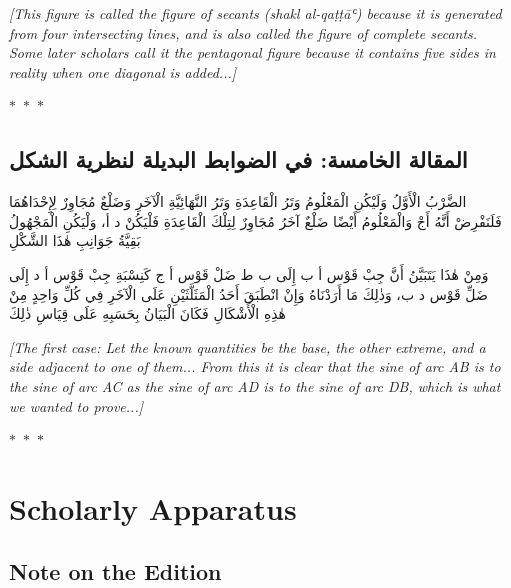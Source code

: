 \documentclass[11pt,a4paper]{article}
\theoremstyle{plain}
\theoremstyle{definition}
\theoremstyle{remark}
\newcommand{\ar}[1]{{\arabicfont\beginR #1\endR}}
\newcommand{\ornament}{\begin{center}\textcolor{goldaccent}{$\ast$~$\ast$~$\ast$}\end{center}}
\begin{document}
\vspace{0.3cm}
\noindent\noindent\textcolor{notecolor}{\textit{[This figure is called the figure of secants (shakl al-qaṭṭāʿ) because it is generated from four intersecting lines, and is also called the figure of complete secants. Some later scholars call it the pentagonal figure because it contains five sides in reality when one diagonal is added...]}}

\ornament

\subsection*{\ar{المقالة الخامسة: في الضوابط البديلة لنظرية الشكل}}

\ar{الضَّرْبُ الْأَوَّلُ وَلَيْكُنِ الْمَعْلُومُ وَتَرُ الْقَاعِدَةِ وَتَرُ النَّهَائِيَّةِ الْآخَرِ وَضَلْعٌ مُجَاوِرٌ لِإِحْدَاهُمَا فَلَنَفْرِضْ أَنَّهُ أَجْ وَالْمَعْلُومُ أَيْضًا ضَلْعٌ آخَرُ مُجَاوِرٌ لِتِلْكَ الْقَاعِدَةِ فَلْيَكُنْ د أ، وَلْيَكُنِ الْمَجْهُولُ بَقِيَّةُ جَوَانِبِ هٰذَا الشَّكْلِ

وَمِنْ هٰذَا يَتَبَيَّنُ أَنَّ جِبْ قَوْس أ ب إِلَى ب ط ضَلْ قَوْس أ ج كَنِسْبَةِ جِبْ قَوْس أ د إِلَى ضَلِّ قَوْس د ب، وَذٰلِكَ مَا أَرَدْنَاهُ وَإِنْ انْطَبَقَ أَحَدُ الْمَثَلَّثَيْنِ عَلَى الْآخَرِ فِي كُلِّ وَاحِدٍ مِنْ هٰذِهِ الْأَشْكَالِ فَكَانَ الْبَيَانُ بِحَسَبِهِ عَلَى قِيَاسِ ذٰلِكَ}

\vspace{0.3cm}
\noindent\textcolor{notecolor}{\textit{[The first case: Let the known quantities be the base, the other extreme, and a side adjacent to one of them... From this it is clear that the sine of arc AB is to the sine of arc AC as the sine of arc AD is to the sine of arc DB, which is what we wanted to prove...]}}

\ornament

\section*{Scholarly Apparatus}

\subsection*{Note on the Edition}
\end{document}
